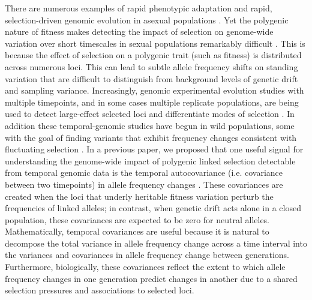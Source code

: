 \documentclass[11pt]{article}
\begin{document}
There are numerous examples of rapid phenotypic adaptation
\parencite{Grant2011-wk,Grant2006-hj,Reznick1997-mh,Franks2007-dr} and rapid,
selection-driven genomic evolution in asexual populations
\parencite{Good2017-om,Bennett1990-bc,Baym2016-kh}.  Yet the polygenic nature
of fitness makes detecting the impact of selection on genome-wide variation
over short timescales in sexual populations remarkably difficult
\parencite{Latta1998-me, Pritchard2010-tk,Kemper2014-bx}. This is because the
effect of selection on a polygenic trait (such as fitness) is distributed
across numerous loci. This can lead to subtle allele frequency shifts on
standing variation that are difficult to distinguish from background levels of
genetic drift and sampling variance. Increasingly, genomic experimental
evolution studies with multiple timepoints, and in some cases multiple
replicate populations, are being used to detect large-effect selected loci
\parencite{Turner2011-sx,Turner2012-bm} and differentiate modes of selection
\parencite{Burke2010-tz,Barghi2019-qy,Therkildsen2019-zy}.  In addition these
temporal-genomic studies have begun in wild populations, some with the goal of
finding variants that exhibit frequency changes consistent with fluctuating
selection \parencite{Bergland2014-ij,Machado2018-cs}. In a previous paper, we
proposed that one useful signal for understanding the genome-wide impact of
polygenic linked selection detectable from temporal genomic data is the
temporal autocovariance (i.e. covariance between two timepoints) in allele
frequency changes \parencite{Buffalo2019-io}.  These covariances are created
when the loci that underly heritable fitness variation perturb the frequencies
of linked alleles; in contrast, when genetic drift acts alone in a closed
population, these covariances are expected to be zero for neutral alleles.
Mathematically, temporal covariances are useful because it is natural to
decompose the total variance in allele frequency change across a time interval
into the variances and covariances in allele frequency change between
generations.  Furthermore, biologically, these covariances reflect the extent
to which allele frequency changes in one generation predict changes in another
due to a shared selection pressures and associations to selected loci.
\end{document}
